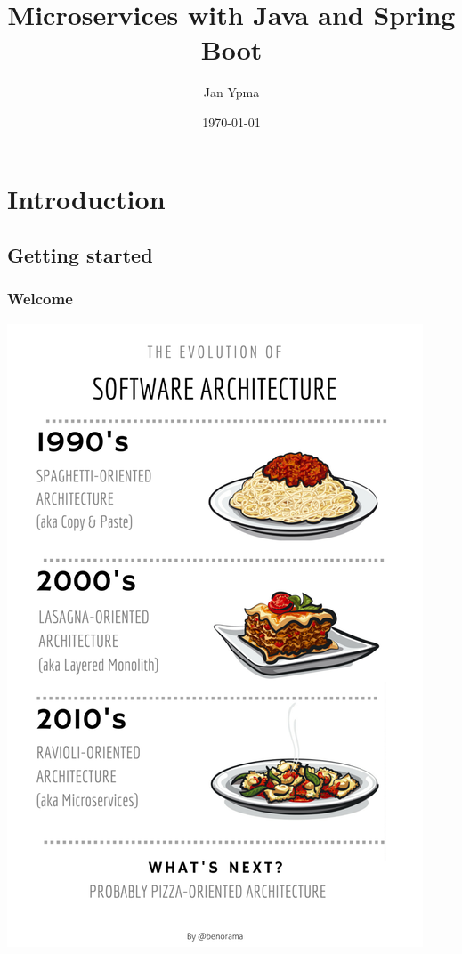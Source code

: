 \documentclass[8pt]{article}
\author{Jan Ypma}
\date{\today}
\title{Microservices with Java and Spring Boot}
\begin{document}
\maketitle
\tableofcontents

\section{Introduction}
\label{sec:org3b887f2}
\subsection{Getting started}
\label{sec:org8456ba8}
\subsubsection{Welcome}
\label{sec:orge7770dd}
\begin{center}
\includegraphics[width=.9\linewidth]{graphics/microservices.png}
\end{center}
\end{document}
